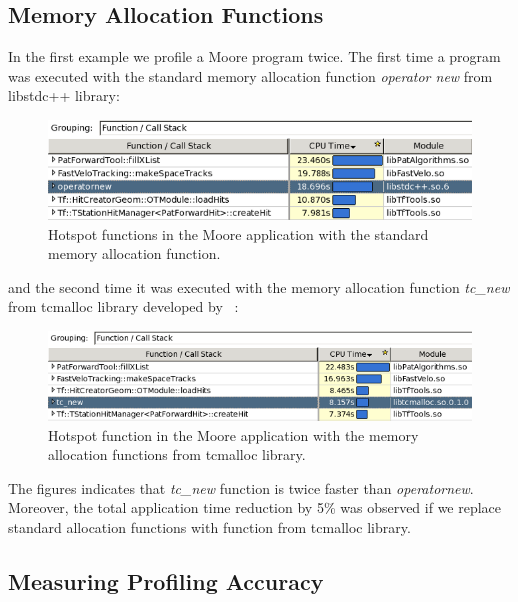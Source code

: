 \documentclass[a4paper]{jpconf}
\begin{document}
\subsection{Memory Allocation Functions}

In the first example we profile a Moore program twice. The first time a program was executed with the standard memory 
allocation function {\it operator new} from libstdc++ library: 

\begin{figure}[H]
\begin{minipage}{\textwidth}
\includegraphics[width=\textwidth]{figs/fig10.png}
\caption{\label{fig10}Hotspot functions in the Moore application with the standard memory allocation function.}
\end{minipage}
\end{figure}

and the second time it was executed with the memory allocation function {\it tc\_new} from tcmalloc library 
developed by \google~\cite{perftools}:
~
\begin{figure}[H]
\begin{minipage}{\textwidth}
\includegraphics[width=\textwidth]{figs/fig11.png}
\caption{\label{fig11}Hotspot function in the Moore application with the memory allocation functions from tcmalloc 
library.}
\end{minipage}
\end{figure}

The figures indicates that {\it tc\_new} function is twice faster than {\it operatornew}. Moreover, the total 
application time reduction by 5\% was observed if we replace standard allocation functions with function 
from tcmalloc library.

\subsection{Measuring Profiling Accuracy}
\end{document}
